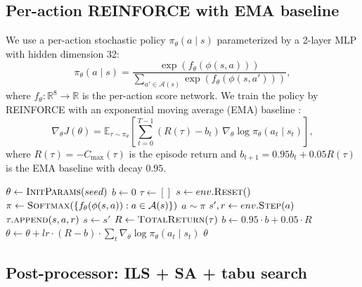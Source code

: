 \documentclass[preprint,review,3p,times,twocolumn]{elsarticle}
\newcommand{\reals}{\mathbb{R}}
\newcommand{\E}{\mathbb{E}}
\begin{document}
\subsection{Per-action REINFORCE with EMA baseline}

We use a per-action stochastic policy
$\pi_\theta(a \mid s)$ parameterized by a 2-layer MLP with
hidden dimension 32:
\begin{equation}
  \pi_\theta(a \mid s) = \frac{\exp(f_\theta(\phi(s, a)))}
  {\sum_{a' \in \mathcal{A}(s)} \exp(f_\theta(\phi(s, a')))},
  \label{eq:policy}
\end{equation}
where $f_\theta : \reals^8 \to \reals$ is the per-action
score network. We train the policy by REINFORCE with an
exponential moving average (EMA) baseline
\citep{Williams1992}:
\begin{equation}
  \nabla_\theta J(\theta) = \E_{\tau \sim \pi_\theta}\!\left[
  \sum_{t=0}^{T-1} (R(\tau) - b_t) \,
  \nabla_\theta \log \pi_\theta(a_t \mid s_t) \right],
  \label{eq:reinforce}
\end{equation}
where $R(\tau) = -C_{\max}(\tau)$ is the episode return and
$b_{t+1} = 0.95 b_t + 0.05 R(\tau)$ is the EMA baseline with
decay $0.95$.

\begin{algorithm}[t]
\caption{Per-Action REINFORCE with EMA Baseline}
\label{alg:reinforce}
\begin{algorithmic}[1]
  \State $\theta \gets \textsc{InitParams}(seed)$
  \State $b \gets 0$
    \State $\tau \gets []$
    \State $s \gets env.\textsc{Reset}()$
      \State $\pi \gets \textsc{Softmax}(\{f_\theta(\phi(s,a)) : a \in \mathcal{A}(s)\})$
      \State $a \sim \pi$
      \State $s', r \gets env.\textsc{Step}(a)$
      \State $\tau.\textsc{append}(s, a, r)$
      \State $s \gets s'$
    \EndWhile
    \State $R \gets \textsc{TotalReturn}(\tau)$
    \State $b \gets 0.95 \cdot b + 0.05 \cdot R$
    \State $\theta \gets \theta + lr \cdot (R - b) \cdot
           \sum_t \nabla_\theta \log \pi_\theta(a_t \mid s_t)$
  \EndFor
  \State \Return $\theta$
\EndFunction
\end{algorithmic}
\end{algorithm}

\subsection{Post-processor: ILS + SA + tabu search}
\end{document}
